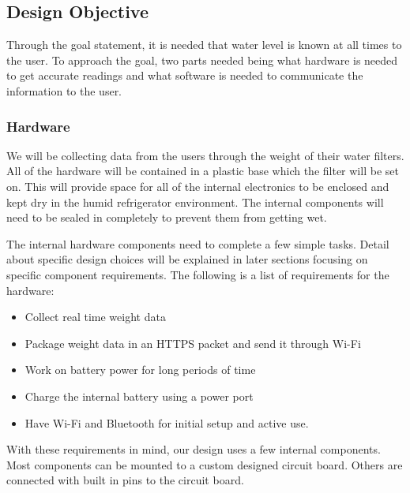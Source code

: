 \subsection{Design Objective}

Through the goal statement, it is needed that water level is known at all times to the user.
To approach the goal, two parts needed being what hardware is needed to get accurate readings and what software is needed to communicate
the information to the user.

\subsubsection{Hardware}
We will be collecting data from the users through the weight of their water filters. All of the hardware will be contained in a plastic base which the filter will be set on. This will provide space for all of the internal electronics to be enclosed and kept dry in the humid refrigerator environment. The internal components will need to be sealed in completely to prevent them from getting wet. 

The internal hardware components need to complete a few simple tasks. Detail about specific design choices will be explained in later sections focusing on specific component requirements. The following is a list of requirements for the hardware:

\begin{itemize}
	\item Collect real time weight data
	\item Package weight data in an HTTPS packet and send it through Wi-Fi
	\item Work on battery power for long periods of time
	\item Charge the internal battery using a power port
	\item Have Wi-Fi and Bluetooth for initial setup and active use. 
\end{itemize}

With these requirements in mind, our design uses a few internal components. Most components can be mounted to a custom designed circuit board. Others are connected with built in pins to the circuit board. 


